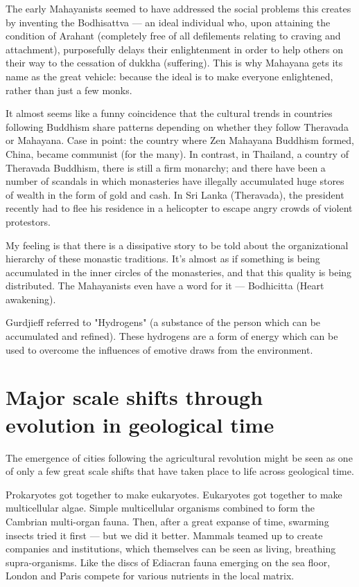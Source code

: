 The early Mahayanists seemed to have addressed the social problems this creates by inventing the Bodhisattva — an ideal individual who, upon attaining the condition of Arahant (completely free of all defilements relating to craving and attachment), purposefully delays their enlightenment in order to help others on their way to the cessation of dukkha (suffering). This is why Mahayana gets its name as the great vehicle: because the ideal is to make everyone enlightened, rather than just a few monks.

It almost seems like a funny coincidence that the cultural trends in countries following Buddhism share patterns depending on whether they follow Theravada or Mahayana. Case in point: the country where Zen Mahayana Buddhism formed, China, became communist (for the many). In contrast, in Thailand, a country of Theravada Buddhism, there is still a firm monarchy; and there have been a number of scandals in which monasteries have illegally accumulated huge stores of wealth in the form of gold and cash. In Sri Lanka (Theravada), the president recently had to flee his residence in a helicopter to escape angry crowds of violent protestors.

My feeling is that there is a dissipative story to be told about the organizational hierarchy of these monastic traditions. It’s almost as if something is being accumulated in the inner circles of the monasteries, and that this quality is being distributed. The Mahayanists even have a word for it — Bodhicitta (Heart awakening).

Gurdjieff referred to "Hydrogens" (a substance of the person which can be accumulated and refined). These hydrogens are a form of energy which can be used to overcome the influences of emotive draws from the environment.

\section{Major scale shifts through evolution in geological time}

The emergence of cities following the agricultural revolution might be seen as one of only a few great scale shifts that have taken place to life across geological time.

Prokaryotes got together to make eukaryotes.
Eukaryotes got together to make multicellular algae.
Simple multicellular organisms combined to form the Cambrian multi-organ fauna.
Then, after a great expanse of time, swarming insects tried it first — but we did it better.
Mammals teamed up to create companies and institutions, which themselves can be seen as living, breathing supra-organisms.
Like the discs of Ediacran fauna emerging on the sea floor, London and Paris compete for various nutrients in the local matrix.

